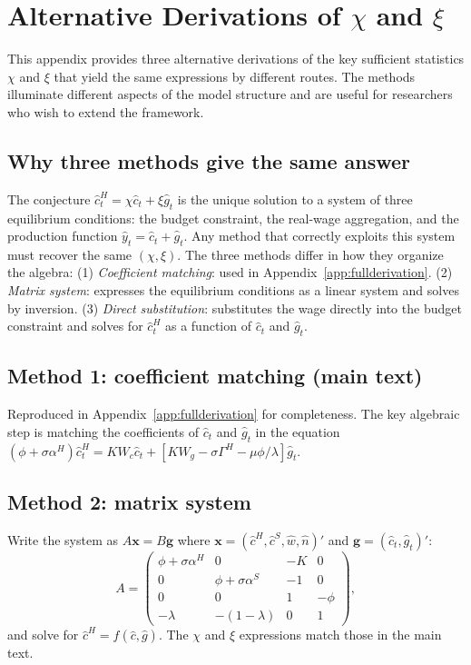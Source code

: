 \section{Alternative Derivations of \texorpdfstring{$\chi$ and $\xi$}{chi and xi}}\label{app:alt-derivations}

This appendix provides three alternative derivations of the key sufficient
statistics $\chi$ and $\xi$ that yield the same expressions by different
routes. The methods illuminate different aspects of the model structure and
are useful for researchers who wish to extend the framework.

\subsection{Why three methods give the same answer}\label{app:why-three}
The conjecture $\hat c^{H}_{t}=\chi\hat c_{t}+\xi\hat g_{t}$ is the unique
solution to a system of three equilibrium conditions: the \HtM{} budget
constraint, the real-wage aggregation, and the production function
$\hat y_{t}=\hat c_{t}+\hat g_{t}$. Any method that correctly exploits this
system must recover the same $(\chi,\xi)$. The three methods differ in how
they organize the algebra:
(1) \emph{Coefficient matching}: used in Appendix~\ref{app:fullderivation}.
(2) \emph{Matrix system}: expresses the equilibrium conditions as a linear
system and solves by inversion.
(3) \emph{Direct substitution}: substitutes the wage directly into the \HtM{}
budget constraint and solves for $\hat c^{H}_{t}$ as a function of $\hat c_{t}$
and $\hat g_{t}$.

\subsection{Method 1: coefficient matching (main text)}\label{app:method-1}
Reproduced in Appendix~\ref{app:fullderivation} for completeness. The key
algebraic step is matching the coefficients of $\hat c_{t}$ and $\hat g_{t}$
in the equation $(\phi+\sigma\alpha^{H})\hat c^{H}_{t}=KW_{c}\hat c_{t}+[KW_{g}-\sigma\Gamma^{H}-\mu\phi/\lambda]\hat g_{t}$.

\subsection{Method 2: matrix system}\label{app:method-2}
Write the system as $A\mathbf{x}=B\mathbf{g}$ where $\mathbf{x}=(\hat c^{H},\hat c^{S},\hat w,\hat n)'$ and $\mathbf{g}=(\hat c_{t},\hat g_{t})'$:
\[
  A=\begin{pmatrix}
  \phi+\sigma\alpha^{H} & 0 & -K & 0\\
  0 & \phi+\sigma\alpha^{S} & -1 & 0\\
  0 & 0 & 1 & -\phi\\
  -\lambda & -(1-\lambda) & 0 & 1
  \end{pmatrix},
\]
and solve for $\hat c^{H}=f(\hat c,\hat g)$. The $\chi$ and $\xi$ expressions
match those in the main text.

